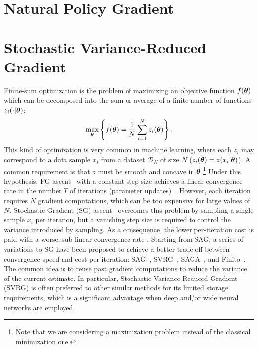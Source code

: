 \vspace{-0.05in}
\section{Natural Policy Gradient}\label{sec:npg}

\vspace{-0.05in}
\section{Stochastic Variance-Reduced Gradient}\label{sec:svrg}
\vspace{-0.05in}
Finite-sum optimization is the problem of maximizing an objective function $f(\boldsymbol{\theta})$ which can be decomposed into the sum or average of a finite number of functions $z_i(\cdot|\boldsymbol{\theta})$:
\begin{align*}
        \max_{\boldsymbol{\theta}} \left\{ f(\boldsymbol{\theta}) = \frac{1}{N}\sum_{i=1}^{N}z_i(\boldsymbol{\theta})\right\}.
\end{align*}
This kind of optimization is very common in machine learning, where each $z_i$ may correspond to a data sample $x_i$ from a dataset $\mathcal{D}_N$ of size $N$ (\ie $z_i(\boldsymbol{\theta}) = z(x_i|\boldsymbol{\theta})$). 
A common requirement is that $z$ must be smooth and concave in $\boldsymbol{\theta}$.\footnote{Note that we are considering a maximization problem instead of the classical minimization one.} 
Under this hypothesis, \acs{FG} ascent~\citep{cauchy1847methode} with a constant step size achieves a linear convergence rate in the number $T$ of iterations (\ie parameter updates)~\citep{nesterov2013introductory}.
However, each iteration requires $N$ gradient computations, which can be too expensive for large values of $N$. Stochastic Gradient (\acs{SG}) ascent~\citep[\eg][]{robbins1951stochastic,bottou2004large} overcomes this problem by sampling a single sample $x_i$ per iteration, but a vanishing step size is required to control the variance introduced by sampling. As a consequence, the lower per-iteration cost is paid with a worse, sub-linear convergence rate \cite{nemirovskii1983problem}.
Starting from \acs{SAG}, a series of variations to \acs{SG} have been proposed to achieve a better trade-off between convergence speed and cost per iteration: \eg \acs{SAG}~\citep{roux2012stochastic}, \acs{SVRG}~\cite{johnson2013accelerating}, \acs{SAGA}~\cite{defazio2014saga}, and Finito~\cite{defazio2014finito}. 
The common idea is to reuse past gradient computations to reduce the variance of the current estimate.
In particular, Stochastic Variance-Reduced Gradient (\acs{SVRG}) is often preferred to other similar methods for its limited storage requirements, which is a significant advantage when deep and/or wide neural networks are employed.  

